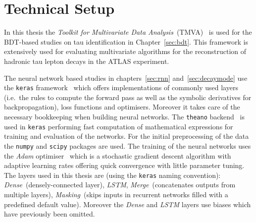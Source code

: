 \section{Technical Setup}
\label{sec:tech_setup}

In this thesis the \emph{Toolkit for Multivariate Data
  Analysis}~(TMVA)~\cite{tmva} is used for the BDT-based studies on tau
identification in Chapter~\ref{sec:bdt}. This framework is extensively used for
evaluating multivariate algorithms for the reconstruction of hadronic tau lepton
decays in the ATLAS experiment.

The neural network based studies in chapters~\ref{sec:rnn}
and~\ref{sec:decaymode} use the \texttt{keras} framework~\cite{keras} which
offers implementations of commonly used layers (i.e.\ the rules to compute the
forward pass as well as the symbolic derivatives for backpropagation), loss
functions and optimisers. Moreover it takes care of the necessary bookkeeping
when building neural networks. The \texttt{theano} backend~\cite{theano} is used
in \texttt{keras} performing fast computation of mathematical expressions for
training and evaluation of the networks. For the initial preprocessing of the
data the \texttt{numpy} \cite{numpy} and \texttt{scipy} \cite{scipy} packages
are used. The training of the neural networks uses the \emph{Adam}
optimiser~\cite{adam} which is a stochastic gradient descent algorithm with
adaptive learning rates offering quick convergence with little parameter tuning.
The layers used in this thesis are (using the \texttt{keras} naming convention):
\emph{Dense}~(densely-connected layer), \emph{LSTM}, \emph{Merge}~(concatenates
outputs from multiple layers), \emph{Masking}~(skips inputs in recurrent
networks filled with a predefined default value). Moreover the \emph{Dense} and
\emph{LSTM} layers use biases which have previously been omitted.

